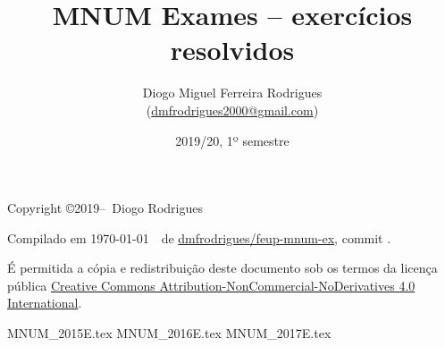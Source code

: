 \documentclass{mnum}
\title{MNUM Exames -- exercícios resolvidos}
\author{Diogo Miguel Ferreira Rodrigues \\ (\href{mailto:dmfrodrigues2000@gmail.com}{dmfrodrigues2000@gmail.com})}
\date{2019/20, 1º semestre}
\begin{document}
\maketitle
\begin{secondpage}
    Copyright \copyright 2019--\the\year\ Diogo Rodrigues\par
    \par
    \immediate{}
    Compilado em \today~\currenttime~de \href{https://github.com/dmfrodrigues/feup-mnum-ex}{dmfrodrigues/feup-mnum-ex}, commit \unskip.\par
    É permitida a cópia e redistribuição deste documento sob os termos da licença pública
    \href{https://creativecommons.org/licenses/by-nc-nd/4.0/}{Creative Commons Attribution-NonCommercial-NoDerivatives 4.0 International}.
\end{secondpage}
\frontmatter
\tableofcontents
\mainmatter
{MNUM_2015E.tex}
{MNUM_2016E.tex}
{MNUM_2017E.tex}
\end{document}

